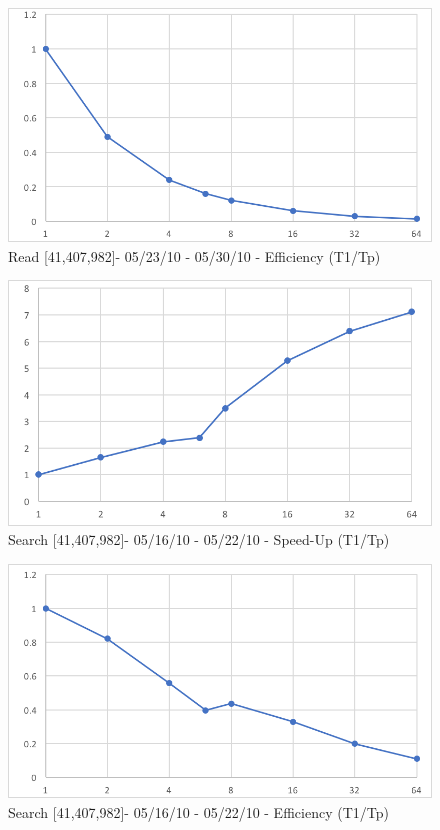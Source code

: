 \documentclass[12pt]{article} %
\begin{document}
\begin{figure}[htb]
\caption{Read [41,407,982]- 05/23/10 - 05/30/10 - Efficiency (T1/Tp)}\label{fig:benchmark01}
\centering
\includegraphics[width=15cm,keepaspectratio]{imgs/img14.png}
\end{figure} 

\begin{figure}[htb]
\caption{Search [41,407,982]- 05/16/10 - 05/22/10 - Speed-Up (T1/Tp)}\label{fig:benchmark01}
\centering
\includegraphics[width=15cm,keepaspectratio]{imgs/img15.png}
\end{figure} 

\begin{figure}[htb]
\caption{Search [41,407,982]- 05/16/10 - 05/22/10 - Efficiency (T1/Tp)}\label{fig:benchmark01}
\centering
\includegraphics[width=15cm,keepaspectratio]{imgs/img16.png}
\end{figure} 
\end{document}
